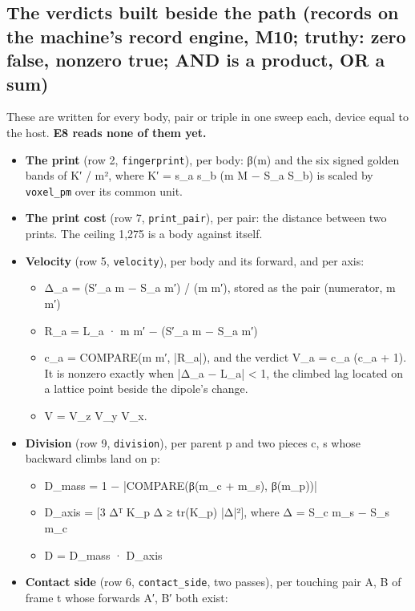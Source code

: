 \subsection{\texorpdfstring{The verdicts built beside the path (records on the machine's record engine, M10; truthy: zero false, nonzero true; AND is a product, OR a sum)}{The verdicts built beside the path (records on the machine's record engine, M10; truthy: zero false, nonzero true; AND is a product, OR a sum)}}

These are written for every body, pair or triple in one sweep each, device equal to the host. \textbf{E8 reads none of them yet.}

\begin{itemize}
\item \textbf{The print} (row 2, \texttt{fingerprint}), per body: β(m) and the six signed golden bands of K′ / m², where K′ = s\_\allowbreak{}a s\_\allowbreak{}b (m M − S\_\allowbreak{}a S\_\allowbreak{}b) is scaled by \texttt{voxel\_\allowbreak{}pm} over its common unit.
\item \textbf{The print cost} (row 7, \texttt{print\_\allowbreak{}pair}), per pair: the distance between two prints. The ceiling 1,275 is a body against itself.
\item \textbf{Velocity} (row 5, \texttt{velocity}), per body and its forward, and per axis:

\begin{itemize}
\item Δ\_\allowbreak{}a = (S′\_\allowbreak{}a m − S\_\allowbreak{}a m′) / (m m′), stored as the pair (numerator, m m′)
\item R\_\allowbreak{}a = L\_\allowbreak{}a · m m′ − (S′\_\allowbreak{}a m − S\_\allowbreak{}a m′)
\item c\_\allowbreak{}a = COMPARE(m m′, |R\_\allowbreak{}a|), and the verdict V\_\allowbreak{}a = c\_\allowbreak{}a (c\_\allowbreak{}a + 1). It is nonzero exactly when |Δ\_\allowbreak{}a − L\_\allowbreak{}a| < 1, the climbed lag located on a lattice point beside the dipole's change.
\item V = V\_\allowbreak{}z V\_\allowbreak{}y V\_\allowbreak{}x.
\end{itemize}
\item \textbf{Division} (row 9, \texttt{division}), per parent p and two pieces c, s whose backward climbs land on p:

\begin{itemize}
\item D\_\allowbreak{}mass = 1 − |COMPARE(β(m\_\allowbreak{}c + m\_\allowbreak{}s), β(m\_\allowbreak{}p))|
\item D\_\allowbreak{}axis = [3 Δᵀ K\_\allowbreak{}p Δ ≥ tr(K\_\allowbreak{}p) |Δ|²], where Δ = S\_\allowbreak{}c m\_\allowbreak{}s − S\_\allowbreak{}s m\_\allowbreak{}c
\item D = D\_\allowbreak{}mass · D\_\allowbreak{}axis
\end{itemize}
\item \textbf{Contact side} (row 6, \texttt{contact\_\allowbreak{}side}, two passes), per touching pair A, B of frame t whose forwards A′, B′ both exist:


\end{itemize}
